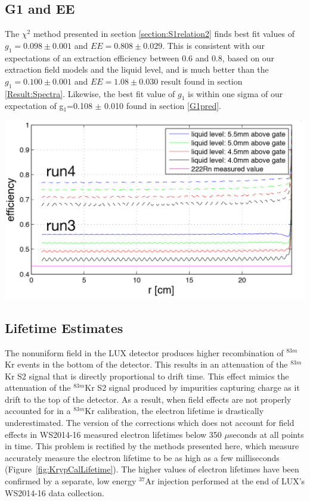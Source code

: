 \subsection{G1 and EE}

The $\chi^2$ method presented in section \ref{section:S1relation2} finds best fit values of $g_1=0.098 \pm 0.001$ and $EE=0.808 \pm 0.029$.  This is consistent with our expectations of an extraction efficiency between 0.6 and 0.8, based on our extraction field models and the liquid level, and is much better than the $g_1=0.100 \pm 0.001$ and $EE=1.08 \pm 0.030$ result found in section \ref{Result:Spectra}.  Likewise, the best fit value of $g_1$ is within one sigma of our expectation of g$_1$=0.108 $\pm$ 0.010 found in section \ref{G1pred}. 

\begin{center}
\includegraphics[scale=0.3]{Run04Corrections/GuschinEE.png}
 \label{EEexpec}
\end{center}


\subsection{Lifetime Estimates}

The nonuniform field in the LUX detector produces higher recombination of $^{83m}$Kr events in the bottom of the detector.  This results in an attenuation of the $^{83m}$Kr S2 signal that is directly proportional to drift time.  This effect mimics the attenuation of the $^{83m}$Kr S2 signal produced by impurities capturing charge as it drift to the top of the detector.  As a result, when field effects are not properly accounted for in a $^{83m}$Kr calibration, the electron lifetime is drastically underestimated.  The version of the corrections which does not account for field effects in WS2014-16 measured electron lifetimes below 350 $\mu$seconds at all points in time.  This problem is rectified by the methods presented here, which measure accurately measure the electron lifetime to be as high as a few milliseconds (Figure~\ref{fig:KrypCalLifetime}). The higher values of electron lifetimes have been confirmed by a separate, low energy $^{37}$Ar injection performed at the end of LUX's WS2014-16 data collection.

